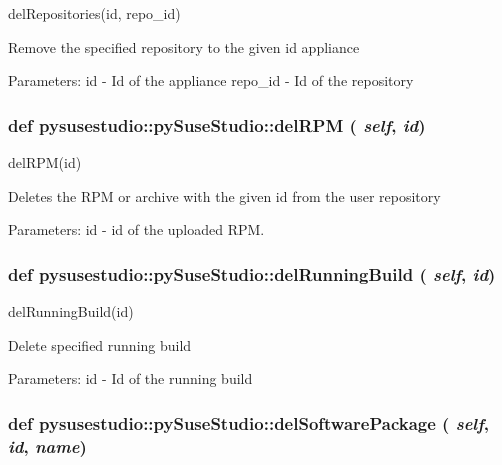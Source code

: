 \label{classpysusestudio_1_1py_suse_studio_a25daf579acd05aa6b674fa2e7c61e2f8}
\begin{DoxyVerb}delRepositories(id, repo_id)

            Remove the specified repository to the given id appliance
            
            Parameters:
id - Id of the appliance
repo_id - Id of the repository

\end{DoxyVerb}
 \hypertarget{classpysusestudio_1_1py_suse_studio_a91d190ecb9f6590fbc9268724a65b87d}{
\subsubsection[{delRPM}]{\setlength{\rightskip}{0pt plus 5cm}def pysusestudio::pySuseStudio::delRPM ( {\em self}, \/   {\em id})}}
\label{classpysusestudio_1_1py_suse_studio_a91d190ecb9f6590fbc9268724a65b87d}
\begin{DoxyVerb}delRPM(id)

            Deletes the RPM or archive with the given id from the user repository
            
            Parameters:
id - id of the uploaded RPM.

\end{DoxyVerb}
 \hypertarget{classpysusestudio_1_1py_suse_studio_a00a994e839162b466150f65b96c79d53}{
\subsubsection[{delRunningBuild}]{\setlength{\rightskip}{0pt plus 5cm}def pysusestudio::pySuseStudio::delRunningBuild ( {\em self}, \/   {\em id})}}
\label{classpysusestudio_1_1py_suse_studio_a00a994e839162b466150f65b96c79d53}
\begin{DoxyVerb}delRunningBuild(id)

            Delete specified running build
            
            Parameters:
id - Id of the running build

\end{DoxyVerb}
 \hypertarget{classpysusestudio_1_1py_suse_studio_a85fb426704d174487ce90469476e319a}{
\subsubsection[{delSoftwarePackage}]{\setlength{\rightskip}{0pt plus 5cm}def pysusestudio::pySuseStudio::delSoftwarePackage ( {\em self}, \/   {\em id}, \/   {\em name})}}
